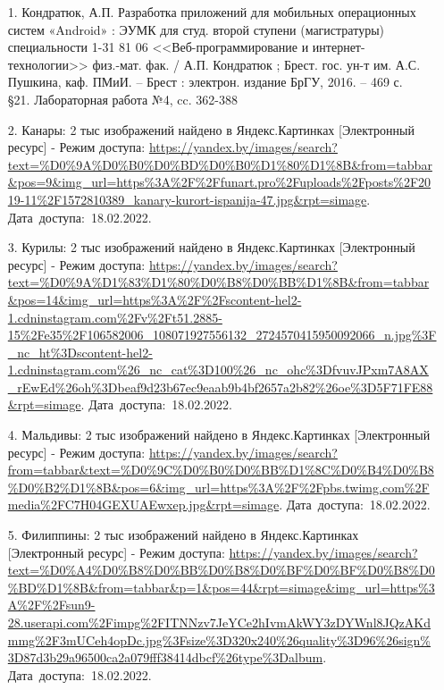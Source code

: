 \documentclass[12pt, a4paper, simple]{eskdtext}
\begin{document}
    \begin{enumerate}
        \item[1.] Кондратюк, А.П. Разработка приложений для мобильных операционных систем «Android» :
        ЭУМК для студ. второй ступени (магистратуры) специальности 1-31 81 06 <<Веб-программирование и интернет-технологии>>
        физ.-мат. фак. / А.П. Кондратюк ; Брест. гос. ун-т им. А.С. Пушкина, каф. ПМиИ. – Брест :
        электрон. издание БрГУ, 2016. – 469 с.\\
        §21. Лабораторная работа №4, cc. 362-388
        \item[2.] Канары: 2 тыс изображений найдено в Яндекс.Картинках [Электронный ресурс]
        - Режим доступа: \url{https://yandex.by/images/search?text=%D0%9A%D0%B0%D0%BD%D0%B0%D1%80%D1%8B&from=tabbar&pos=9&img_url=https%3A%2F%2Ffunart.pro%2Fuploads%2Fposts%2F2019-11%2F1572810389_kanary-kurort-ispanija-47.jpg&rpt=simage}.
        Дата~доступа:~18.02.2022.
        \item[3.] Курилы: 2 тыс изображений найдено в Яндекс.Картинках [Электронный ресурс]
        - Режим доступа: \url{https://yandex.by/images/search?text=%D0%9A%D1%83%D1%80%D0%B8%D0%BB%D1%8B&from=tabbar&pos=14&img_url=https%3A%2F%2Fscontent-hel2-1.cdninstagram.com%2Fv%2Ft51.2885-15%2Fe35%2F106582006_108071927556132_2724570415950092066_n.jpg%3F_nc_ht%3Dscontent-hel2-1.cdninstagram.com%26_nc_cat%3D100%26_nc_ohc%3DfvuvJPxm7A8AX_rEwEd%26oh%3Dbeaf9d23b67ec9eaab9b4bf2657a2b82%26oe%3D5F71FE88&rpt=simage}.
        Дата~доступа:~18.02.2022.
        \item[4.] Мальдивы: 2 тыс изображений найдено в Яндекс.Картинках [Электронный ресурс]
        - Режим доступа: \url{https://yandex.by/images/search?from=tabbar&text=%D0%9C%D0%B0%D0%BB%D1%8C%D0%B4%D0%B8%D0%B2%D1%8B&pos=6&img_url=https%3A%2F%2Fpbs.twimg.com%2Fmedia%2FC7H04GEXUAEwxep.jpg&rpt=simage}.
        Дата~доступа:~18.02.2022.
        \item[5.] Филиппины: 2 тыс изображений найдено в Яндекс.Картинках [Электронный ресурс]
        - Режим доступа: \url{https://yandex.by/images/search?text=%D0%A4%D0%B8%D0%BB%D0%B8%D0%BF%D0%BF%D0%B8%D0%BD%D1%8B&from=tabbar&p=1&pos=44&rpt=simage&img_url=https%3A%2F%2Fsun9-28.userapi.com%2Fimpg%2FITNNzv7JeYCe2hIvmAkWY3zDYWnl8JQzAKdmmg%2F3mUCeh4opDc.jpg%3Fsize%3D320x240%26quality%3D96%26sign%3D87d3b29a96500ca2a079fff38414dbcf%26type%3Dalbum}.
        Дата~доступа:~18.02.2022.
    \end{enumerate}
    \newpage
\end{document}
